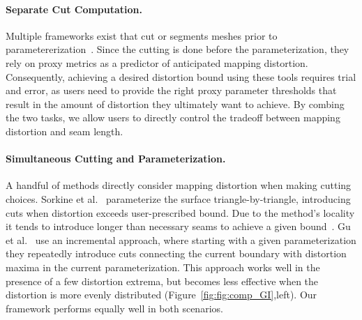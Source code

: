 \paragraph{Separate Cut Computation.}
Multiple frameworks exist that cut or segments meshes prior to parametererization~\cite{Sheffer2002Seamster,Julius2005D,Snyder2003Multi,Levy2002,needMore}.
Since the cutting is done before the parameterization, they rely on proxy metrics as a predictor of anticipated mapping distortion. Consequently, achieving a desired distortion bound using these tools requires trial and error, as users need to provide the right proxy parameter thresholds that result in the amount of distortion they ultimately want to achieve. By combing the two tasks, we allow users to directly control the tradeoff between mapping distortion and seam length. 

\paragraph{Simultaneous Cutting and Parameterization.}
A handful of methods directly consider mapping distortion when making cutting choices. 
Sorkine et al.~ parameterize the surface triangle-by-triangle, introducing cuts when distortion exceeds user-prescribed bound. Due to the method's locality it tends to introduce longer than necessary seams to achieve a given bound~\cite{Hormann2008,Poranne2017Autocuts}. 
Gu et al.~ use an incremental approach, where starting with a given parameterization they  repeatedly introduce cuts connecting the current boundary with distortion maxima in the current parameterization.  This approach works well in the presence of a few distortion extrema, but becomes less effective when the distortion is more evenly distributed (Figure~\ref{fig:fig:comp_GI},left). Our framework performs equally well in both scenarios.  


